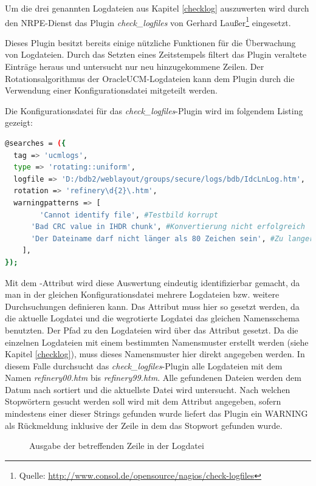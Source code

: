 Um die drei genannten Logdateien aus Kapitel \ref{checklog} auszuwerten wird durch den \gls{NRPE}-Dienst das Plugin \textit{check\_logfiles} von Gerhard Laußer\footnote{Quelle: \url{http://www.consol.de/opensource/nagios/check-logfiles}} eingesetzt.

Dieses Plugin besitzt bereits einige nützliche Funktionen für die Überwachung von Logdateien.
Durch das Setzten eines Zeitstempels filtert das Plugin veraltete Einträge heraus und untersucht nur neu hinzugekommene Zeilen.
Der Rotationsalgorithmus der \gls{OracleUCM}-Logdateien kann dem Plugin durch die Verwendung einer Konfigurationsdatei mitgeteilt werden.

Die Konfigurationsdatei für das \textit{check\_logfiles}-Plugin wird im folgendem Listing gezeigt:


\begin{lstlisting}[captionpos=b, caption=Konfigurationsdatei für \textit{check\_logfiles}, label=chklogcfg, breaklines = true, language=sh]
@searches = ({
  tag => 'ucmlogs',
  type => 'rotating::uniform',
  logfile => 'D:/bdb2/weblayout/groups/secure/logs/bdb/IdcLnLog.htm',
  rotation => 'refinery\d{2}\.htm',
  warningpatterns => [
        'Cannot identify file', #Testbild korrupt
	  'Bad CRC value in IHDR chunk', #Konvertierung nicht erfolgreich
	  'Der Dateiname darf nicht länger als 80 Zeichen sein', #Zu langer Dateiname
    ],
});
\end{lstlisting}

Mit dem -Attribut wird diese Auswertung eindeutig identifizierbar gemacht, da man in der gleichen Konfigurationsdatei mehrere Logdateien bzw. weitere Durchsuchungen definieren kann.
Das Attribut  muss hier so gesetzt werden, da die aktuelle Logdatei und die wegrotierte Logdatei das gleichen Namensschema benutzten.
Der Pfad zu den Logdateien wird über das Attribut  gesetzt.
Da die einzelnen Logdateien mit einem bestimmten Namensmuster erstellt werden (siehe Kapitel \ref{checklog}), muss dieses Namensmuster hier direkt angegeben werden.
In diesem Falle durchsucht das \textit{check\_logfiles}-Plugin alle Logdateien mit dem Namen \textit{refinery00.htm} bis \textit{refinery99.htm}.
Alle gefundenen Dateien werden dem Datum nach sortiert und die aktuellste Datei wird untersucht.
Nach welchen Stopwörtern gesucht werden soll wird mit dem Attribut  angegeben, sofern mindestens einer dieser Strings gefunden wurde liefert das Plugin ein WARNING als Rückmeldung inklusive der Zeile in dem das Stopwort gefunden wurde.

\begin{figure}[ht]
	\centering
		\caption{Ausgabe der betreffenden Zeile in der Logdatei}
		\label{checklogwarn}
\end{figure}






